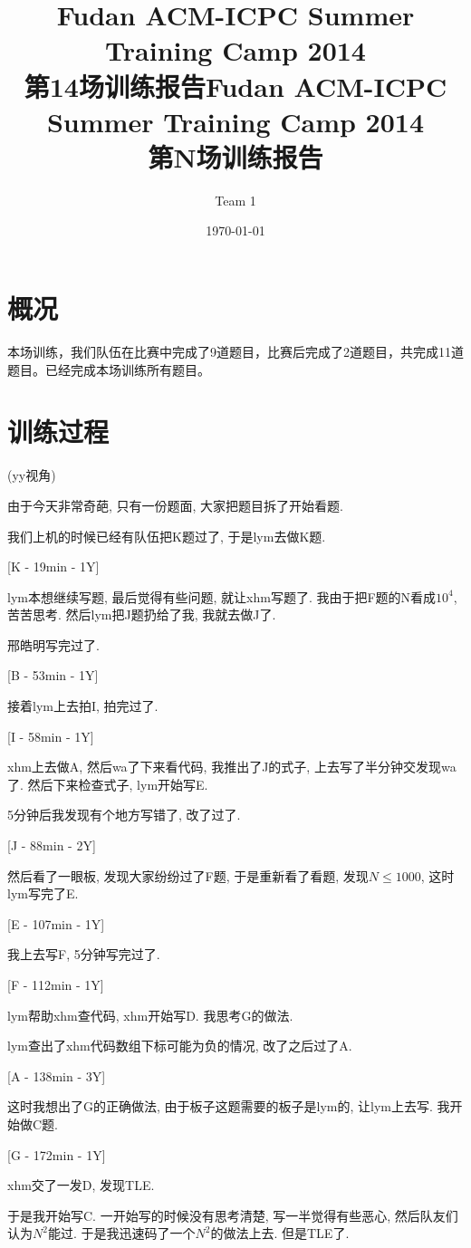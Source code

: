 \documentclass[a4paper, 11pt, nofonts, nocap, fancyhdr]{ctexart}
\title{Fudan ACM-ICPC Summer Training Camp 2014\\第14场训练报告}
\title{Fudan ACM-ICPC Summer Training Camp 2014\\第N场训练报告}
\author{Team 1}
\date{\today}
\begin{document}
\maketitle

\section{概况}

本场训练，我们队伍在比赛中完成了9道题目，比赛后完成了2道题目，共完成11道题目。已经完成本场训练所有题目。


\section{训练过程}

(yy视角)

由于今天非常奇葩, 只有一份题面, 大家把题目拆了开始看题.

我们上机的时候已经有队伍把K题过了, 于是lym去做K题.

[K - 19min - 1Y]

lym本想继续写题, 最后觉得有些问题, 就让xhm写题了. 我由于把F题的N看成$10^4$, 苦苦思考. 然后lym把J题扔给了我, 我就去做J了.

邢皓明写完过了.

[B - 53min - 1Y]

接着lym上去拍I, 拍完过了.

[I - 58min - 1Y]

xhm上去做A, 然后wa了下来看代码, 我推出了J的式子, 上去写了半分钟交发现wa了. 然后下来检查式子, lym开始写E.

5分钟后我发现有个地方写错了, 改了过了.

[J - 88min - 2Y]

然后看了一眼板, 发现大家纷纷过了F题, 于是重新看了看题, 发现$N \leq 1000$, 这时lym写完了E.

[E - 107min - 1Y]

我上去写F, 5分钟写完过了.

[F - 112min - 1Y]

lym帮助xhm查代码, xhm开始写D. 我思考G的做法.

lym查出了xhm代码数组下标可能为负的情况, 改了之后过了A.

[A - 138min - 3Y]

这时我想出了G的正确做法, 由于板子这题需要的板子是lym的, 让lym上去写. 我开始做C题.

[G - 172min - 1Y]

xhm交了一发D, 发现TLE.

于是我开始写C. 一开始写的时候没有思考清楚, 写一半觉得有些恶心, 然后队友们认为$N^2$能过. 于是我迅速码了一个$N^2$的做法上去. 但是TLE了.
\end{document}
